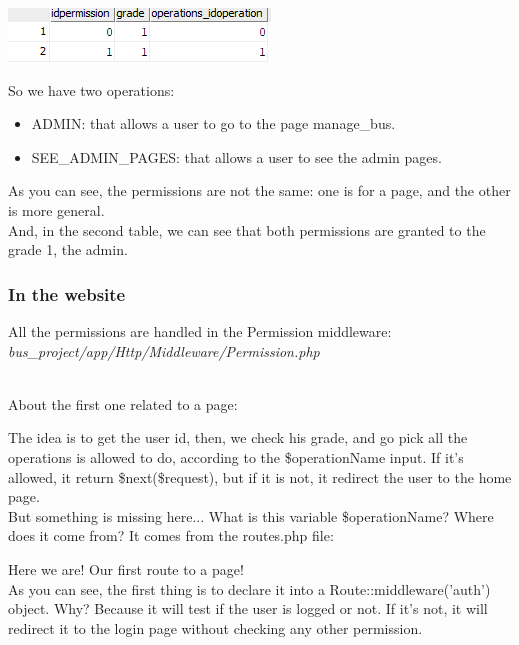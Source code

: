 \documentclass[12pt,a4paper,openany]{book}
\begin{document}
\begin{center}
\includegraphics[scale=1]{Figs/fig7}
\end{center}

So we have two operations:
\begin{itemize}
	\item ADMIN: that allows a user to go to the page manage\_bus.
	\item SEE\_ADMIN\_PAGES: that allows a user to see the admin pages.
\end{itemize}
As you can see, the permissions are not the same: one is for a page, and the other is more general.\\

And, in the second table, we can see that both permissions are granted to the grade 1, the admin.

\subsubsection{In the website}
All the permissions are handled in the Permission middleware:\\ \emph{bus\_project/app/Http/Middleware/Permission.php}\\\

About the first one related to a page: 

\bigskip
The idea is to get the user id, then, we check his grade, and go pick all the operations is allowed to do, according to the \$operationName input. If it's allowed, it return \$next(\$request), but if it is not, it redirect the user to the home page.\\

But something is missing here... What is this variable \$operationName? Where does it come from? It comes from the routes.php file:

\bigskip
Here we are! Our first route to a page!\\

As you can see, the first thing is to declare it into a Route::middleware('auth') object. Why? Because it will test if the user is logged or not. If it's not, it will redirect it to the login page without checking any other permission.\\
\end{document}

